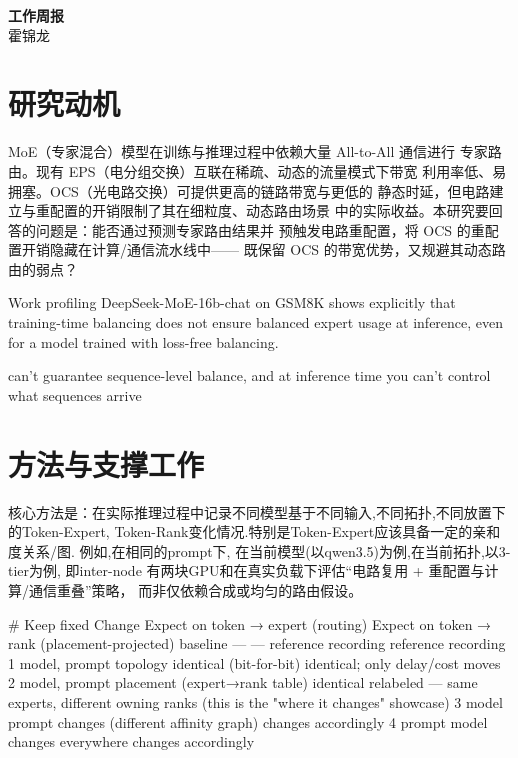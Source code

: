 \documentclass[11pt]{article}
\begin{document}
\begin{center}
{\Large\bfseries 工作周报}\\[0.5em]
{\large 霍锦龙}\\[0.2em]
\end{center}
\vspace{1.5em}


\section{研究动机}

MoE（专家混合）模型在训练与推理过程中依赖大量 All-to-All 通信进行
专家路由。现有 EPS（电分组交换）互联在稀疏、动态的流量模式下带宽
利用率低、易拥塞。OCS（光电路交换）可提供更高的链路带宽与更低的
静态时延，但电路建立与重配置的开销限制了其在细粒度、动态路由场景
中的实际收益。本研究要回答的问题是：能否通过预测专家路由结果并
预触发电路重配置，将 OCS 的重配置开销隐藏在计算/通信流水线中——
既保留 OCS 的带宽优势，又规避其动态路由的弱点？


Work profiling DeepSeek-MoE-16b-chat on GSM8K shows explicitly that training-time balancing does not ensure balanced expert usage at inference, even for a model trained with loss-free balancing.

can't guarantee sequence-level balance, and at inference time you can't control what sequences arrive
\section{方法与支撑工作}

核心方法是：在实际推理过程中记录不同模型基于不同输入,不同拓扑,不同放置下的Token-Expert, Token-Rank变化情况.特别是Token-Expert应该具备一定的亲和度关系/图. 例如,在相同的prompt下, 在当前模型(以qwen3.5)为例,在当前拓扑,以3-tier为例, 即inter-node 有两块GPU和在真实负载下评估“电路复用 + 重配置与计算/通信重叠”策略，
而非仅依赖合成或均匀的路由假设。

#	Keep fixed	Change	Expect on token → expert (routing)	Expect on token → rank (placement-projected)
baseline	—	—	reference recording	reference recording
1	model, prompt	topology	identical (bit-for-bit)	identical; only delay/cost moves
2	model, prompt	placement (expert→rank table)	identical	relabeled — same experts, different owning ranks (this is the "where it changes" showcase)
3	model	prompt	changes (different affinity graph)	changes accordingly
4	prompt	model	changes everywhere	changes accordingly
\end{document}
